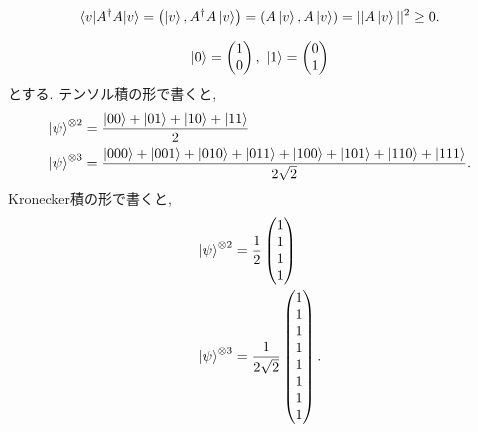 \begin{ex}
    \label{ex2.25}
    \begin{align*}
        \braket{v|A^\dagger A | v}
        = \left(\ket{v}, A^\dagger A\ket{v} \right)
        = \left(A \ket{v},A\ket{v} \right)
        = || A \ket{v}|| ^2 \geq 0.
    \end{align*}
\end{ex}

\begin{ex}
    \label{ex2.26}
    \begin{align*}
        \ket{0} =
        \begin{pmatrix}
            1 \\ 0
        \end{pmatrix}
        , \
        \ket{1} =
        \begin{pmatrix}
            0 \\ 1
        \end{pmatrix}
    \end{align*}
    とする. テンソル積の形で書くと,
    \begin{align*}
        \ket{\psi}^{\otimes 2} & = \frac{\ket{00} + \ket{01} + \ket{10} + \ket{11}}{2} \\
        \ket{\psi}^{\otimes 3} & = \frac{
            \ket{000} + \ket{001} + \ket{010} + \ket{011}
            +\ket{100} + \ket{101} + \ket{110} + \ket{111} }{2\sqrt{2}}.
    \end{align*}
    Kronecker積の形で書くと,
    \begin{align*}
        \ket{\psi}^{\otimes 2}
         & = \frac{1}{2}
        \begin{pmatrix}
            1 \\ 1 \\ 1 \\ 1
        \end{pmatrix} \\
        \ket{\psi}^{\otimes 3}
         & = \frac{1}{2\sqrt{2}}
        \begin{pmatrix}
            1 \\ 1 \\ 1 \\ 1 \\ 1 \\ 1 \\ 1 \\ 1
        \end{pmatrix}.
    \end{align*}
\end{ex}

